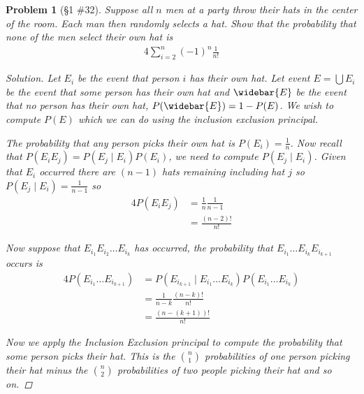 \documentclass[11pt, oneside]{book}   	%
\newtheorem{problem}{Problem}
\begin{document}
\begin{problem}[\S 1 \#32]
	Suppose all $n$ men at a party throw their hats in the center of the room. Each man then randomly selects a hat. Show that the probability that none of the men select their own hat is
	\begin{alignat}{4}
		\sum_{i=2}^n(-1)^n\frac{1}{n!}
	\end{alignat}
	\begin{proof}[Solution]
		Let $E_i$ be the event that person $i$ has their own hat. Let event $E=\bigcup E_i$ be the event that some person has their own hat and $\widebar{E}$ be the event that no person has their own hat, $P(\widebar{E})=1-P(E)$. We wish to compute $P(E)$ which we can do using the inclusion exclusion principal. 
		
		The probability that any person picks their own hat is $P(E_i)=\frac{1}{n}$. Now recall that $P(E_iE_j)=P(E_j\mid E_i)P(E_i)$, we need to compute $P(E_j\mid E_i)$. Given that $E_i$ occurred there are $(n-1)$ hats remaining including hat $j$ so $P(E_j\mid E_i)=\frac{1}{n-1}$ so 
		\begin{alignat*}{4}
			P(E_iE_j)&=\frac{1}{n}\frac{1}{n-1} \\
				&=\frac{(n-2)!}{n!}
		\end{alignat*}
		
		Now suppose that $E_{i_1}E_{i_2}\dots E_{i_k}$ has occurred, the probability that $E_{i_1} \dots E_{i_k}E_{i_{k+1}}$ occurs is 
		\begin{alignat*}{4}
			P(E_{i_1}\dots E_{i_{k+1}})&=P(E_{i_{k+1}}\mid E_{i_1}\dots E_{i_k})P(E_{i_1}\dots E_{i_k}) \\
				&=\frac{1}{n-k}\frac{(n-k)!}{n!} \\
				&=\frac{(n-(k+1))!}{n!}
		\end{alignat*}
		
		Now we apply the Inclusion Exclusion principal to compute the probability that some person picks their hat. This is the $\binom{n}{1}$ probabilities of one person picking their hat minus the $\binom{n}{2}$ probabilities of two people picking their hat and so on. 


\end{proof}
\end{problem}
\end{document}
